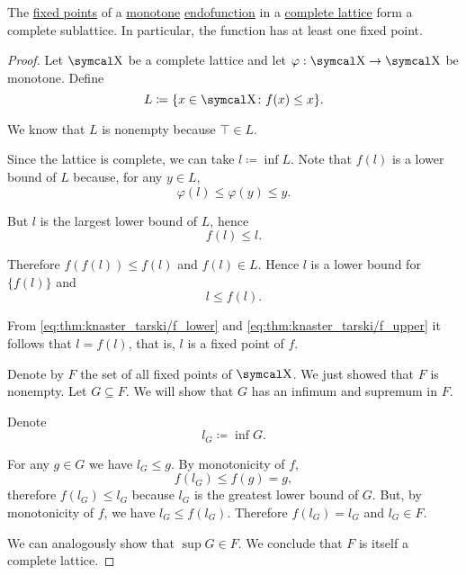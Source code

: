 \begin{proposition}\label{thm:knaster_tarski}
  The \hyperref[def:fixed_point]{fixed points} of a \hyperref[def:monotone_map]{monotone} \hyperref[def:endofunction]{endofunction} in a \hyperref[def:lattice]{complete lattice} form a complete sublattice. In particular, the function has at least one fixed point.
\end{proposition}
\begin{proof}
  Let \( \CX \) be a complete lattice and let \( \varphi: \CX \to \CX \) be monotone. Define
  \begin{equation*}
    L \coloneqq \{ x \in \CX \colon f(x) \leq x \}.
  \end{equation*}

  We know that \( L \) is nonempty because \( \top \in L \).

  Since the lattice is complete, we can take \( l \coloneqq \inf L \). Note that \( f(l) \) is a lower bound of \( L \) because, for any \( y \in L \),
  \begin{equation*}
    \varphi(l) \leq \varphi(y) \leq y.
  \end{equation*}

  But \( l \) is the largest lower bound of \( L \), hence
  \begin{equation}\label{eq:thm:knaster_tarski/f_lower}
    f(l) \leq l.
  \end{equation}

  Therefore \( f(f(l)) \leq f(l) \) and \( f(l) \in L \). Hence \( l \) is a lower bound for \( \{ f(l) \} \) and
  \begin{equation}\label{eq:thm:knaster_tarski/f_upper}
    l \leq f(l).
  \end{equation}

  From \eqref{eq:thm:knaster_tarski/f_lower} and \eqref{eq:thm:knaster_tarski/f_upper} it follows that \( l = f(l) \), that is, \( l \) is a fixed point of \( f \).

  Denote by \( F \) the set of all fixed points of \( \CX \). We just showed that \( F \) is nonempty. Let \( G \subseteq F \). We will show that \( G \) has an infimum and supremum in \( F \).

  Denote
  \begin{equation*}
    l_G \coloneqq \inf G.
  \end{equation*}

  For any \( g \in G \) we have \( l_G \leq g \). By monotonicity of \( f \),
  \begin{equation*}
    f(l_G) \leq f(g) = g,
  \end{equation*}
  therefore \( f(l_G) \leq l_G \) because \( l_G \) is the greatest lower bound of \( G \). But, by monotonicity of \( f \), we have \( l_G \leq f(l_G) \). Therefore \( f(l_G) = l_G \) and \( l_G \in F \).

  We can analogously show that \( \sup G \in F \). We conclude that \( F \) is itself a complete lattice.
\end{proof}

